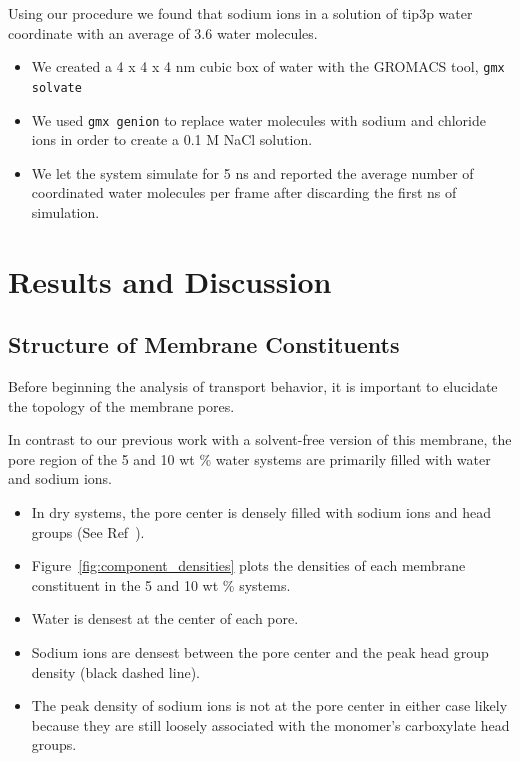 \documentclass{article}
\begin{document}
  Using our procedure we found that sodium ions in a solution of tip3p water
  coordinate with an average of 3.6 water molecules.
  \begin{itemize}
    \item We created a 4 x 4 x 4 nm cubic box of water with the GROMACS tool,
    \texttt{gmx solvate}
    \item We used \texttt{gmx genion} to replace water molecules with sodium
    and chloride ions in order to create a 0.1 M NaCl solution.
    \item We let the system simulate for 5 ns and reported the average
    number of coordinated water molecules per frame after discarding the first ns of 
    simulation. %
  \end{itemize}
   
  \section{Results and Discussion}
  
  \subsection*{Structure of Membrane Constituents}\label{section:membrane_components}
  
  Before beginning the analysis of transport behavior, it is important to elucidate
  the topology of the membrane pores.  
  
  
  In contrast to our previous work with a solvent-free version of this membrane, the pore
  region of the 5 and 10 wt \% water systems are primarily filled with water and sodium
  ions.
  \begin{itemize}
    \item In dry systems, the pore center is densely filled with sodium ions and 
    head groups (See Ref~\cite{coscia_understanding_2019}).
    \item Figure~\ref{fig:component_densities} plots the densities of each
    membrane constituent in the 5 and 10 wt \% systems.
    \item Water is densest at the center of each pore. 
    \item Sodium ions are densest between the pore center and the peak head group density (black dashed line).
    \item The peak density of sodium ions is not at the pore center in either case
    likely because they are still loosely associated with the monomer's 
    carboxylate head groups.
  \end{itemize}
  
\end{document}
